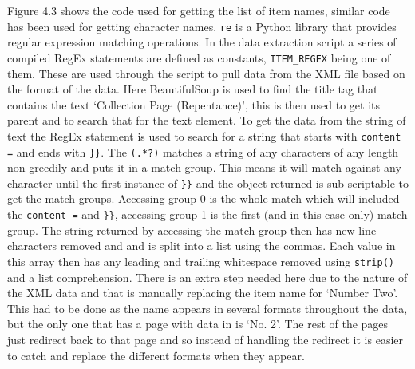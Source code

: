 Figure 4.3 shows the code used for getting the list of item names, similar code has been used for getting character names.
\verb|re| is a Python library that provides regular expression matching operations. In the data extraction script a series of 
compiled RegEx statements are defined as constants, \verb|ITEM_REGEX| being one of them. These are used through the script 
to pull data from the XML file based on the format of the data. Here BeautifulSoup is used to find the title tag that contains the text 
`Collection Page (Repentance)', this is then used to get its parent and to search that for the text element. 
To get the data from the string of text the RegEx statement is used to search for a string that starts with \verb|content =| and ends with \verb|}}|.
The \verb|(.*?)| matches a string of any characters of any length non-greedily and puts it in a match group. 
This means it will match against any character until the first instance of \verb|}}| and the object returned is sub-scriptable to get the match groups.
Accessing group 0 is the whole match which will included the \verb|content =| and \verb|}}|, accessing group 1 is the first (and in this case only) match group.
The string returned by accessing the match group then has new line characters removed and and is split into a list using the commas.
Each value in this array then has any leading and trailing whitespace removed using \verb|strip()| and a list comprehension.
There is an extra step needed here due to the nature of the XML data and that is manually replacing the item name for `Number Two'.
This had to be done as the name appears in several formats throughout the data, but the only one that has a page with data in is `No. 2'. 
The rest of the pages just redirect back to that page and so instead of handling the redirect it is easier to catch and replace the different formats when they appear.

